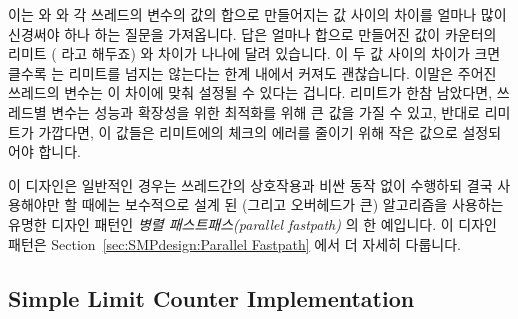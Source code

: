 이는  와  와 각 쓰레드의  변수의
값의 합으로 만들어지는 값 사이의 차이를 얼마나 많이 신경써야 하나 하는 질문을
가져옵니다.
답은 얼마나 합으로 만들어진 값이 카운터의 리미트 ( 라고
해두죠) 와 차이가 나나에 달려 있습니다.
이 두 값 사이의 차이가 크면 클수록  는 
리미트를 넘지는 않는다는 한계 내에서 커져도 괜찮습니다.
이말은 주어진 쓰레드의  변수는 이 차이에 맞춰 설정될 수 있다는
겁니다.
리미트가 한참 남았다면,  쓰레드별 변수는 성능과 확장성을 위한
최적화를 위해 큰 값을 가질 수 있고, 반대로 리미트가 가깝다면, 이 값들은
 리미트에의 체크의 에러를 줄이기 위해 작은 값으로 설정되어야
합니다.

이 디자인은 일반적인 경우는 쓰레드간의 상호작용과 비싼 동작 없이 수행하되 결국
사용해야만 할 때에는 보수적으로 설계 된 (그리고 오버헤드가 큰) 알고리즘을
사용하는 유명한 디자인 패턴인 \emph{병렬 패스트패스(parallel fastpath)} 의 한
예입니다.
이 디자인 패턴은 Section~\ref{sec:SMPdesign:Parallel Fastpath} 에서 더 자세히
다룹니다.

\subsection{Simple Limit Counter Implementation}
\label{sec:count:Simple Limit Counter Implementation}

